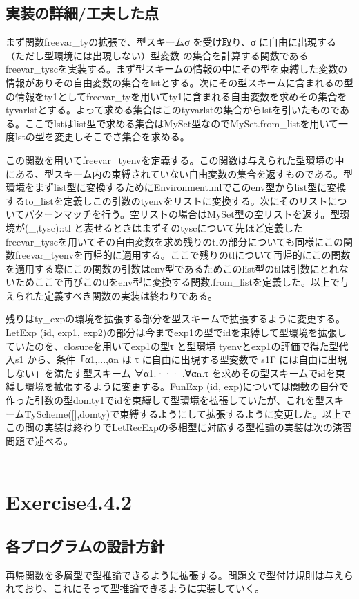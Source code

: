 \documentclass[a4paper,11pt,oneside,openany]{jsarticle}
\begin{document}
\subsection{実装の詳細/工夫した点}
  まず関数freevar\_tyの拡張で、型スキームσ を受け取り、σ に自由に出現する（ただし型環境には出現しない）型変数 の集合を計算する関数であるfreevar\_tyscを実装する。まず型スキームの情報の中にその型を束縛した変数の情報がありその自由変数の集合をlstとする。次にその型スキームに含まれるの型の情報をty1としてfreevar\_tyを用いてty1に含まれる自由変数を求めその集合をtyvarlstとする。よって求める集合はこのtyvarlstの集合からlstを引いたものである。ここでlstはlist型で求める集合はMySet型なのでMySet.from\_listを用いて一度lstの型を変更しそこでさ集合を求める。\par
  この関数を用いてfreevar\_tyenvを定義する。この関数は与えられた型環境の中にある、型スキーム内の束縛されていない自由変数の集合を返すものである。型環境をまずlist型に変換するためにEnvironment.mlでこのenv型からlist型に変換するto\_listを定義しこの引数のtyenvをリストに変換する。次にそのリストについてパターンマッチを行う。空リストの場合はMySet型の空リストを返す。型環境が(\_,tysc)::tl と表せるときはまずそのtyscについて先ほど定義したfreevar\_tyscを用いてその自由変数を求め残りのtlの部分についても同様にこの関数freevar\_tyenvを再帰的に適用する。ここで残りのtlについて再帰的にこの関数を適用する際にこの関数の引数はenv型であるためこのlist型のtlは引数にとれないためここで再びこのtlをenv型に変換する関数.from\_listを定義した。以上で与えられた定義すべき関数の実装は終わりである。\par
  残りはty\_expの環境を拡張する部分を型スキームで拡張するように変更する。 LetExp (id, exp1, exp2)の部分は今までexp1の型でidを束縛して型環境を拡張していたのを、closureを用いてexp1の型τ と型環境 tyenvとexp1の評価で得た型代入s1 から、条件「α1,...,αn は τ に自由に出現する型変数で s1Γ には自由に出現しない」を満たす型スキーム ∀α1.··· .∀αn.τ を求めその型スキームでidを束縛し環境を拡張するように変更する。FunExp (id, exp)については関数の自分で作った引数の型domty1でidを束縛して型環境を拡張していたが、これを型スキームTyScheme([],domty)で束縛するようにして拡張するように変更した。以上でこの問の実装は終わりでLetRecExpの多相型に対応する型推論の実装は次の演習問題で述べる。
\\\\

\section{Exercise4.4.2}
  \subsection{各プログラムの設計方針}
    再帰関数を多層型で型推論できるように拡張する。問題文で型付け規則は与えられており、これにそって型推論できるように実装していく。
\end{document}
